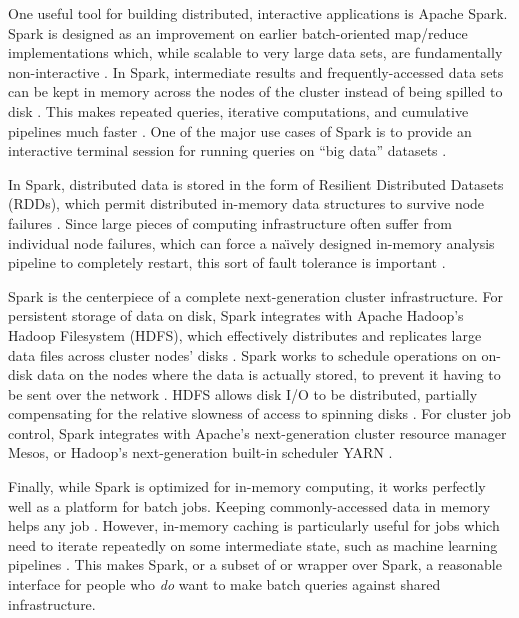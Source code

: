 \documentclass[11pt,proposal]{ucthesis}
\begin{document}
One useful tool for building distributed, interactive applications is Apache Spark. Spark is designed as an improvement on earlier batch-oriented map/reduce implementations which, while scalable to very large data sets, are fundamentally non-interactive \cite{zaharia2012fast,zaharia2012resilient}. In Spark, intermediate results and frequently-accessed data sets can be kept in memory across the nodes of the cluster instead of being spilled to disk \cite{zaharia2012fast,zaharia2012resilient}. This makes repeated queries, iterative computations, and cumulative pipelines much faster \cite{zaharia2012fast,zaharia2012resilient}. One of the major use cases of Spark is to provide an interactive terminal session for running queries on ``big data'' datasets \cite{zaharia2012fast,apache2014interactive}.

In Spark, distributed data is stored in the form of Resilient Distributed Datasets (RDDs), which permit distributed in-memory data structures to survive node failures \cite{zaharia2012resilient}. Since large pieces of computing infrastructure often suffer from individual node failures, which can force a na\"{\i}vely designed in-memory analysis pipeline to completely restart, this sort of fault tolerance is important \cite{thanakornworakij2013reliability}.

Spark is the centerpiece of a complete next-generation cluster infrastructure. For persistent storage of data on disk, Spark integrates with Apache Hadoop's Hadoop Filesystem (HDFS), which effectively distributes and replicates large data files across cluster nodes' disks \cite{zaharia2012fast,borthakur2008hdfs}. Spark works to schedule operations on on-disk data on the nodes where the data is actually stored, to prevent it having to be sent over the network \cite{borthakur2008hdfs}. HDFS allows disk I/O to be distributed, partially compensating for the relative slowness of access to spinning disks \cite{borthakur2008hdfs}. For cluster job control, Spark integrates with Apache's next-generation cluster resource manager Mesos, or Hadoop's next-generation built-in scheduler YARN \cite{apache2014cluster}.

Finally, while Spark is optimized for in-memory computing, it works perfectly well as a platform for batch jobs. Keeping commonly-accessed data in memory helps any job \cite{zaharia2012fast}. However, in-memory caching is particularly useful for jobs which need to iterate repeatedly on some intermediate state, such as machine learning pipelines \cite{zaharia2012fast}. This makes Spark, or a subset of or wrapper over Spark, a reasonable interface for people who \textit{do} want to make batch queries against shared infrastructure.
\end{document}

